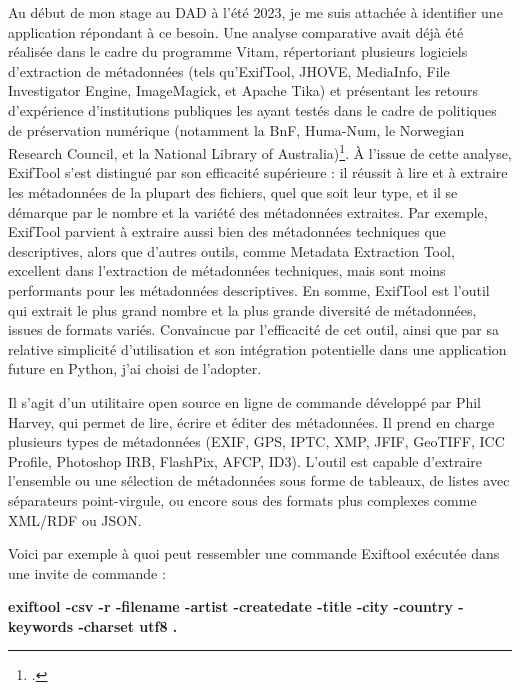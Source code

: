 Au début de mon stage au DAD à l'été 2023, je me suis attachée à identifier une application répondant à ce besoin. Une analyse comparative avait déjà été réalisée dans le cadre du programme Vitam, répertoriant plusieurs logiciels d'extraction de métadonnées (tels qu'ExifTool, JHOVE, MediaInfo, File Investigator Engine, ImageMagick, et Apache Tika) et présentant les retours d'expérience d'institutions publiques les ayant testés dans le cadre de politiques de préservation numérique (notamment la BnF, Huma-Num, le Norwegian Research Council, et la National Library of Australia)\footcite[pp.19-42]{programmevitamExtractionMetadonneesTechniques2020}. À l'issue de cette analyse, ExifTool s'est distingué par son efficacité supérieure : il réussit à lire et à extraire les métadonnées de la plupart des fichiers, quel que soit leur type, et il se démarque par le nombre et la variété des métadonnées extraites. Par exemple, ExifTool parvient à extraire aussi bien des métadonnées techniques que descriptives, alors que d'autres outils, comme Metadata Extraction Tool, excellent dans l'extraction de métadonnées techniques, mais sont moins performants pour les métadonnées descriptives. En somme, ExifTool est l'outil qui extrait le plus grand nombre et la plus grande diversité de métadonnées, issues de formats variés. Convaincue par l'efficacité de cet outil, ainsi que par sa relative simplicité d'utilisation et son intégration potentielle dans une application future en Python, j'ai choisi de l'adopter.

Il s'agit d'un utilitaire open source en ligne de commande développé par Phil Harvey, qui permet de lire, écrire et éditer des métadonnées. Il prend en charge plusieurs types de métadonnées (EXIF, GPS, IPTC, XMP, JFIF, GeoTIFF, ICC Profile, Photoshop IRB, FlashPix, AFCP, ID3). L'outil est capable d'extraire l'ensemble ou une sélection de métadonnées sous forme de tableaux, de listes avec séparateurs point-virgule, ou encore sous des formats plus complexes comme XML/RDF ou JSON.

Voici par exemple à quoi peut ressembler une commande Exiftool exécutée dans une invite de commande : 

\begin{displayquote}
	\begin{center}
\textbf{exiftool -csv -r -filename -artist -createdate -title -city -country -keywords -charset utf8 . }
\end{center}
\end{displayquote}

